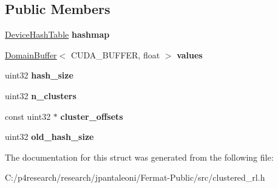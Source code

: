 \subsection*{Public Members}
\begin{DoxyCompactItemize}
\item 
\mbox{\label{struct_clustered_r_l_storage_a3acff6c4ac3c6f5d3c02bf78ead67356}} 
\hyperlink{struct_device_hash_table}{Device\+Hash\+Table} {\bfseries hashmap}
\item 
\mbox{\label{struct_clustered_r_l_storage_af3a0096e3b6a3094bef12992b7836207}} 
\hyperlink{class_domain_buffer}{Domain\+Buffer}$<$ C\+U\+D\+A\+\_\+\+B\+U\+F\+F\+ER, float $>$ {\bfseries values}
\item 
\mbox{\label{struct_clustered_r_l_storage_aa238fd3a424bf22c83cbde232c1ac1eb}} 
uint32 {\bfseries hash\+\_\+size}
\item 
\mbox{\label{struct_clustered_r_l_storage_af0819b2be3ca0503d7e93a0ed152eaff}} 
uint32 {\bfseries n\+\_\+clusters}
\item 
\mbox{\label{struct_clustered_r_l_storage_a9cb6e900f69b2d554cf85debddcd5616}} 
const uint32 $\ast$ {\bfseries cluster\+\_\+offsets}
\item 
\mbox{\label{struct_clustered_r_l_storage_a326a561b8d3a694d5211ebb35d3df0ea}} 
uint32 {\bfseries old\+\_\+hash\+\_\+size}
\end{DoxyCompactItemize}


The documentation for this struct was generated from the following file\+:\begin{DoxyCompactItemize}
\item 
C\+:/p4research/research/jpantaleoni/\+Fermat-\/\+Public/src/clustered\+\_\+rl.\+h\end{DoxyCompactItemize}
